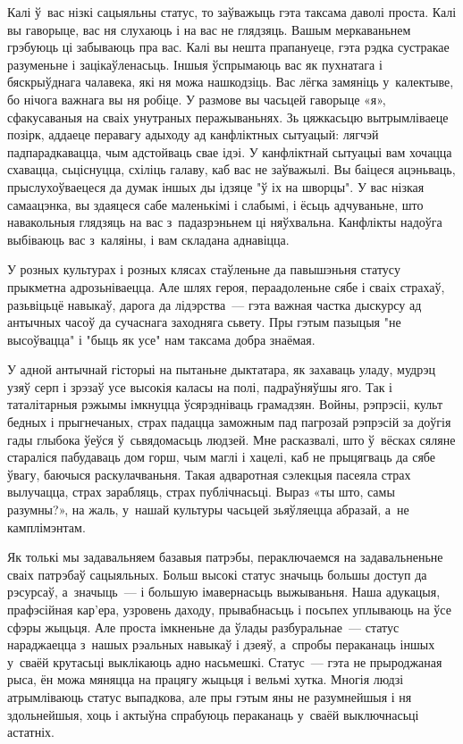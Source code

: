 Калі ў~вас нізкі сацыяльны статус, то заўважыць гэта таксама даволі проста. Калі вы гаворыце, вас ня слухаюць і на вас не глядзяць. Вашым меркаваньнем грэбуюць ці забываюць пра вас. Калі вы нешта прапануеце, гэта рэдка сустракае разуменьне і зацікаўленасьць. Іншыя ўспрымаюць вас як пухнатага і бяскрыўднага чалавека, які ня можа нашкодзіць. Вас лёгка замяніць у~калектыве, бо нічога важнага вы ня робіце. У размове вы часьцей гаворыце «я», сфакусаваныя на сваіх унутраных перажываньнях. Зь цяжкасьцю вытрымліваеце позірк, аддаеце перавагу адыходу ад канфліктных сытуацый: лягчэй падпарадкавацца, чым адстойваць свае ідэі. У канфліктнай сытуацыі вам хочацца схавацца, сьціснуцца, схіліць галаву, каб вас не заўважылі. Вы баіцеся ацэньваць, прыслухоўваецеся да думак іншых ды ідзяце "ў іх на шворцы". У вас нізкая самаацэнка, вы здаяцеся сабе маленькімі і слабымі, і ёсьць адчуваньне, што навакольныя глядзяць на вас з~падазрэньнем ці няўхвальна. Канфлікты надоўга выбіваюць вас з~каляіны, і вам складана аднавіцца.

У розных культурах і розных клясах стаўленьне да павышэньня статусу прыкметна адрозьніваецца. Але шлях героя, пераадоленьне сябе і сваіх страхаў, разьвіцьцё навыкаў, дарога да лідэрства~--- гэта важная частка дыскурсу ад антычных часоў да сучаснага заходняга сьвету. Пры гэтым пазыцыя "не высоўвацца" і "быць як усе" нам таксама добра знаёмая.

У адной антычнай гісторыі на пытаньне дыктатара, як захаваць уладу, мудрэц узяў серп і зрэзаў усе высокія каласы на полі, падраўняўшы яго. Так і таталітарныя рэжымы імкнуцца ўсярэдніваць грамадзян. Войны, рэпрэсіі, культ бедных і прыгнечаных, страх падацца заможным пад пагрозай рэпрэсій за доўгія гады глыбока ўеўся ў~сьвядомасьць людзей. Мне расказвалі, што ў~вёсках сяляне стараліся пабудаваць дом горш, чым маглі і хацелі, каб не прыцягваць да сябе ўвагу, баючыся раскулачваньня. Такая адваротная сэлекцыя пасеяла страх вылучацца, страх зарабляць, страх публічнасьці. Выраз «ты што, самы разумны?», на жаль, у~нашай культуры часьцей зьяўляецца абразай, а~не камплімэнтам.

Як толькі мы задавальняем базавыя патрэбы, пераключаемся на задавальненьне сваіх патрэбаў сацыяльных. Больш высокі статус значыць большы доступ да рэсурсаў, а~значыць~--- і большую імавернасьць выжываньня. Наша адукацыя, прафэсійная кар'ера, узровень даходу, прывабнасьць і посьпех уплываюць на ўсе сфэры жыцьця. Але проста імкненьне да ўлады разбуральнае~--- статус нараджаецца з~нашых рэальных навыкаў і дзеяў, а~спробы пераканаць іншых у~сваёй крутасьці выклікаюць адно насьмешкі. Статус~--- гэта не прыроджаная рыса, ён можа мяняцца на працягу жыцьця і вельмі хутка. Многія людзі атрымліваюць статус выпадкова, але пры гэтым яны не разумнейшыя і ня здольнейшыя, хоць і актыўна спрабуюць пераканаць у~сваёй выключнасьці астатніх.


